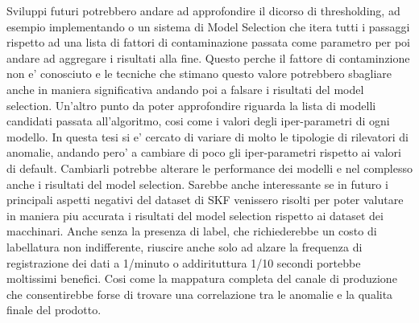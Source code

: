 Sviluppi futuri potrebbero andare ad approfondire il dicorso di thresholding, ad esempio implementando o un sistema di Model Selection che itera tutti i passaggi rispetto ad una lista di fattori di contaminazione passata come parametro per poi andare ad aggregare i risultati alla fine. Questo perche il fattore di contaminzione non e' conosciuto e le tecniche che stimano questo valore potrebbero sbagliare anche in maniera significativa andando poi a falsare i risultati del model selection.
Un'altro punto da poter approfondire riguarda la lista di modelli candidati passata all'algoritmo, cosi come i valori degli iper-parametri di ogni modello. In questa tesi si e' cercato di variare di molto le tipologie di rilevatori di anomalie, andando pero' a cambiare di poco gli iper-parametri rispetto ai valori di default. Cambiarli potrebbe alterare le performance dei modelli e nel complesso anche i risultati del model selection.
Sarebbe anche interessante se in futuro i principali aspetti negativi del dataset di SKF venissero risolti per poter valutare in maniera piu accurata i risultati del model selection rispetto ai dataset dei macchinari. Anche senza la presenza di label, che richiederebbe un costo di labellatura non indifferente, riuscire anche solo ad alzare la frequenza di registrazione dei dati a 1/minuto o addirituttura 1/10 secondi portebbe moltissimi benefici. Cosi come la mappatura completa del canale di produzione che consentirebbe forse di trovare una correlazione tra le anomalie e la qualita finale del prodotto.